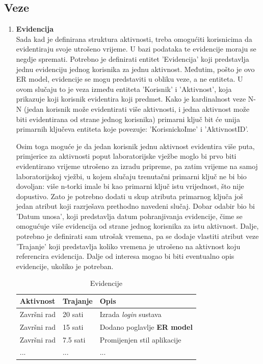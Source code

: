 \documentclass[times, utf8, zavrsni, numeric]{fer}
\begin{document}
\subsection{Veze}
\begin{enumerate}[leftmargin=*]
\item \textbf{Evidencija}\\
Sada kad je definirana struktura aktivnosti, treba omogućiti korisnicima da evidentiraju svoje utrošeno vrijeme. U bazi podataka te evidencije moraju se negdje spremati. Potrebno je definirati entitet 'Evidencija' koji predstavlja jednu evidenciju jednog korisnika za jednu aktivnost. Međutim, pošto je ovo ER model, evidencije se mogu predstaviti u obliku veze, a ne entiteta. U ovom slučaju to je veza između entiteta 'Korisnik' i 'Aktivnost', koja prikazuje koji korisnik evidentira koji predmet. Kako je kardinalnost veze N-N (jedan korisnik može evidentirati više aktivnosti, i jedna aktivnost može biti evidentirana od strane jednog korisnika) primarni ključ bit će unija primarnih ključeva entiteta koje povezuje: 'KorisnickoIme' i 'AktivnostID'.

Osim toga moguće je da jedan korisnik jednu aktivnost evidentira više puta, primjerice za aktivnosti poput laboratorijske vježbe moglo bi prvo biti evidentirano vrijeme utrošeno za izradu pripreme, pa zatim vrijeme na samoj laboratorijskoj vježbi, u kojem slučaju trenutačni primarni ključ ne bi bio dovoljan: više n-torki imale bi kao primarni ključ istu vrijednost, što nije dopustivo. Zato je potrebno dodati u skup atributa primarnog ključa još jedan atribut koji razrješava prethodno navedeni slučaj. Dobar odabir bio bi 'Datum unosa', koji predstavlja datum pohranjivanja evidencije, čime se omogućuje više evidencija od strane jednog korisnika za istu aktivnost. Dalje, potrebno je definirati sam utrošak vremena, pa se dodaje vlastiti atribut veze 'Trajanje' koji predstavlja koliko vremena je utrošeno na aktivnost koju referencira evidencija. Dalje od interesa mogao bi biti eventualno opis evidencije, ukoliko je potreban. 

\begin{table}[H]
\caption{Evidencije}
\label{tbl:talica-evidencija}
\centering
\begin{tabular}{lll} \hline
Aktivnost & Trajanje & Opis\\ \hline
Završni rad & 20 sati & Izrada \emph{login} sustava\\ 
Završni rad & 15 sati & Dodano poglavlje \textbf{ER model}\\
Završni rad & 7.5 sati & Promijenjen stil aplikacije\\
... & ... & ...\\
\end{tabular}
\end{table}


\end{enumerate}
\end{document}
